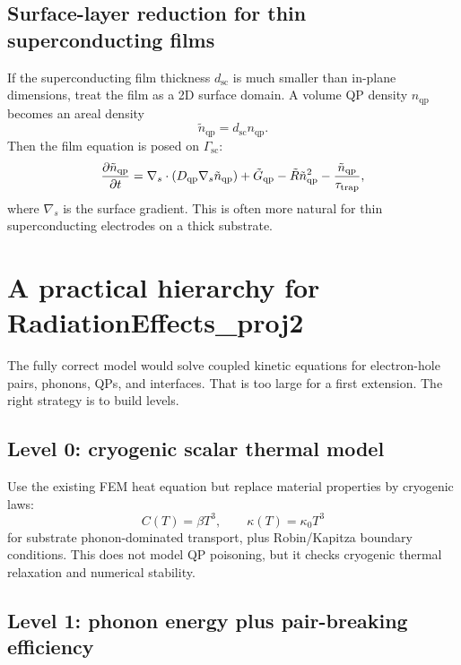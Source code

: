 \documentclass[11pt]{article}
\newcommand{\nqp}{n_{\mathrm{qp}}}
\newcommand{\tautrap}{\tau_{\mathrm{trap}}}
\begin{document}
\subsection{Surface-layer reduction for thin superconducting films}

If the superconducting film thickness \(d_{\mathrm{sc}}\) is much smaller than in-plane dimensions, treat the film as a 2D surface domain. A volume QP density \(\nqp\) becomes an areal density
\begin{equation}
\tilde n_{\mathrm{qp}}=d_{\mathrm{sc}}\nqp.
\end{equation}
Then the film equation is posed on \(\Gamma_{\mathrm{sc}}\):
\begin{equation}
\pdv{\tilde n_{\mathrm{qp}}}{t}
=\nabla_s\cdot(D_{\mathrm{qp}}\nabla_s\tilde n_{\mathrm{qp}})
+\tilde G_{\mathrm{qp}}-\tilde R\tilde n_{\mathrm{qp}}^2-\frac{\tilde n_{\mathrm{qp}}}{\tautrap},
\label{eq:surface_qp}
\end{equation}
where \(\nabla_s\) is the surface gradient. This is often more natural for thin superconducting electrodes on a thick substrate.

\section{A practical hierarchy for RadiationEffects\_proj2}

The fully correct model would solve coupled kinetic equations for electron-hole pairs, phonons, QPs, and interfaces. That is too large for a first extension. The right strategy is to build levels.

\subsection{Level 0: cryogenic scalar thermal model}

Use the existing FEM heat equation but replace material properties by cryogenic laws:
\begin{equation}
C(T)=\beta T^3,
\qquad
\kappa(T)=\kappa_0 T^3
\end{equation}
for substrate phonon-dominated transport, plus Robin/Kapitza boundary conditions. This does not model QP poisoning, but it checks cryogenic thermal relaxation and numerical stability.

\subsection{Level 1: phonon energy plus pair-breaking efficiency}
\end{document}
